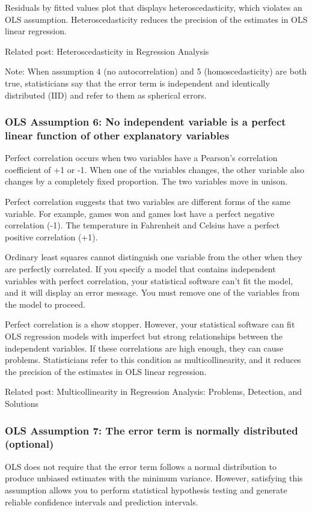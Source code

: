 \documentclass[12pt]{book}
\begin{document}
Residuals by fitted values plot that displays heteroscedasticity, which violates an OLS assumption.
Heteroscedasticity reduces the precision of the estimates in OLS linear regression.

Related post: Heteroscedasticity in Regression Analysis

Note: When assumption 4 (no autocorrelation) and 5 (homoscedasticity) are both true, statisticians say that the error term is independent and identically distributed (IID) and refer to them as spherical errors.

\subsubsection{OLS Assumption 6: No independent variable is a perfect linear function of other explanatory variables}
Perfect correlation occurs when two variables have a Pearson’s correlation coefficient of +1 or -1. When one of the variables changes, the other variable also changes by a completely fixed proportion. The two variables move in unison.

Perfect correlation suggests that two variables are different forms of the same variable. For example, games won and games lost have a perfect negative correlation (-1). The temperature in Fahrenheit and Celsius have a perfect positive correlation (+1).

Ordinary least squares cannot distinguish one variable from the other when they are perfectly correlated. If you specify a model that contains independent variables with perfect correlation, your statistical software can’t fit the model, and it will display an error message. You must remove one of the variables from the model to proceed.

Perfect correlation is a show stopper. However, your statistical software can fit OLS regression models with imperfect but strong relationships between the independent variables. If these correlations are high enough, they can cause problems. Statisticians refer to this condition as multicollinearity, and it reduces the precision of the estimates in OLS linear regression.

Related post: Multicollinearity in Regression Analysis: Problems, Detection, and Solutions

\subsubsection{OLS Assumption 7: The error term is normally distributed (optional)}
OLS does not require that the error term follows a normal distribution to produce unbiased estimates with the minimum variance. However, satisfying this assumption allows you to perform statistical hypothesis testing and generate reliable confidence intervals and prediction intervals.
\end{document}
